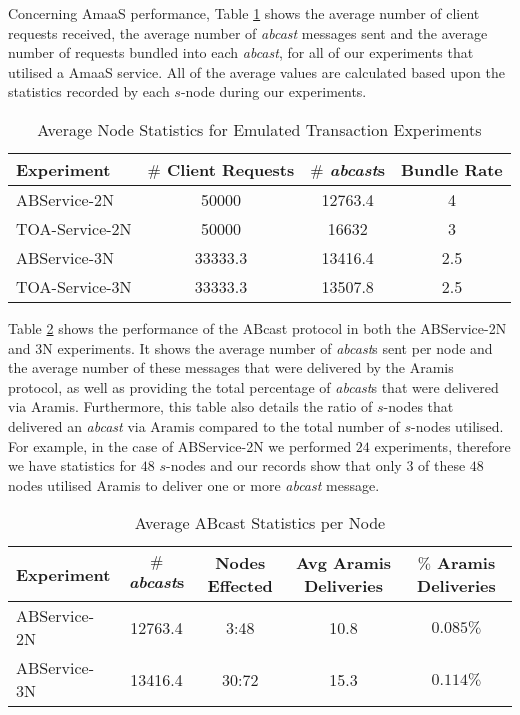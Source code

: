 	Concerning \textsf{AmaaS} performance, Table \ref{table:emulated_transaction_averages} shows the average number of client requests received, the average number of \emph{abcast} messages sent and the average number of requests bundled into each \emph{abcast}, for all of our experiments that utilised a \textsf{AmaaS} service.  All of the average values are calculated based upon the statistics recorded by each $s$-node during our experiments. 
	
    \begin{table}[h]
  \begin{center}
    \begin{tabular}{|l|c|c|c|}
    \hline
    Experiment & $\#$ Client Requests  & $\#$ \emph{abcast}s & Bundle Rate \\ \hline \hline
    ABService-2N     & 50000    &    12763.4    &    4 \\ \hline
    TOA-Service-2N  & 50000    &   16632    &   3 \\ \hline
    ABService-3N     & 33333.3 &    13416.4  &   2.5 \\ \hline
    TOA-Service-3N  & 33333.3 &    13507.8 & 2.5 \\ \hline
    \end{tabular}
    \caption{Average Node Statistics for Emulated Transaction Experiments}
    \label{table:emulated_transaction_averages}
  \end{center}
\end{table}	
	
    Table \ref{table:emulated_transcation_aramis_deliveries} shows the performance of the \textsf{ABcast} protocol in both the ABService-2N and 3N experiments.  It shows the average number of \emph{abcast}s sent per node and the average number of these messages that were delivered by the Aramis protocol, as well as providing the total percentage of \emph{abcast}s that were delivered via Aramis.  Furthermore, this table also details the ratio of $s$-nodes that delivered an \emph{abcast} via Aramis compared to the total number of $s$-nodes utilised.  For example, in the case of ABService-2N we performed $24$ experiments, therefore we have statistics for $48$ $s$-nodes and our records show that only $3$ of these $48$ nodes utilised Aramis to deliver one or more \emph{abcast} message.  
	
	\begin{table}[h]
	  \begin{center}
	    \begin{tabular}{|l|c|c|c|c|}
	    \hline
	    Experiment  & $\#$ \emph{abcast}s & Nodes Effected &  Avg Aramis Deliveries & $\%$ Aramis Deliveries \\ \hline \hline
	    ABService-2N & 12763.4 & 3:48   & 10.8  & $0.085\%$  \\ \hline
	    ABService-3N & 13416.4 & 30:72 & 15.3  & $0.114\%$ \\ \hline
	    \end{tabular}
	    \caption{Average ABcast Statistics per Node}
	    \label{table:emulated_transcation_aramis_deliveries}
	  \end{center}
	\end{table}	
	
